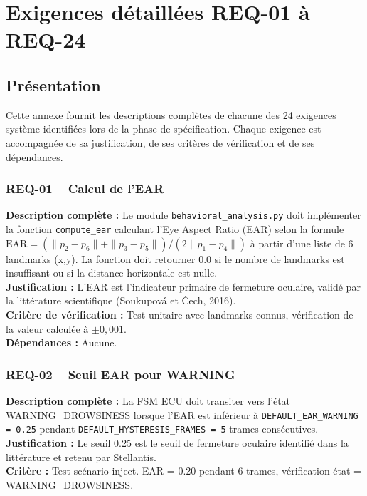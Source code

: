 \documentclass[12pt,a4paper]{report}
\begin{document}
\clearpage

\appendix
\renewcommand{\chaptername}{Annexe}


\chapter{Exigences d\'etaill\'ees REQ-01 \`a REQ-24}

\section{Pr\'esentation}

Cette annexe fournit les descriptions compl\`etes de chacune des 24 exigences syst\`eme identifi\'ees lors de la phase de sp\'ecification. Chaque exigence est accompagn\'ee de sa justification, de ses crit\`eres de v\'erification et de ses d\'ependances.

\subsection*{REQ-01 -- Calcul de l'EAR}
\textbf{Description compl\`ete :} Le module \texttt{behavioral\_analysis.py} doit impl\'ementer la fonction \texttt{compute\_ear} calculant l'Eye Aspect Ratio (EAR) selon la formule $\text{EAR} = (\|p_2-p_6\| + \|p_3-p_5\|) / (2\|p_1-p_4\|)$ \`a partir d'une liste de 6 landmarks (x,y). La fonction doit retourner 0.0 si le nombre de landmarks est insuffisant ou si la distance horizontale est nulle.\\
\textbf{Justification :} L'EAR est l'indicateur primaire de fermeture oculaire, valid\'e par la litt\'erature scientifique (Soukupov\'a et \v{C}ech, 2016).\\
\textbf{Crit\`ere de v\'erification :} Test unitaire avec landmarks connus, v\'erification de la valeur calcul\'ee \`a $\pm 0{,}001$.\\
\textbf{D\'ependances :} Aucune.

\subsection*{REQ-02 -- Seuil EAR pour WARNING}
\textbf{Description compl\`ete :} La FSM ECU doit transiter vers l'\'etat WARNING\_DROWSINESS lorsque l'EAR est inf\'erieur \`a \texttt{DEFAULT\_EAR\_WARNING = 0.25} pendant \texttt{DEFAULT\_HYSTERESIS\_FRAMES = 5} trames cons\'ecutives.\\
\textbf{Justification :} Le seuil 0.25 est le seuil de fermeture oculaire identifi\'e dans la litt\'erature et retenu par Stellantis.\\
\textbf{Crit\`ere :} Test sc\'enario inject. EAR = 0.20 pendant 6 trames, v\'erification \'etat = WARNING\_DROWSINESS.
\end{document}
